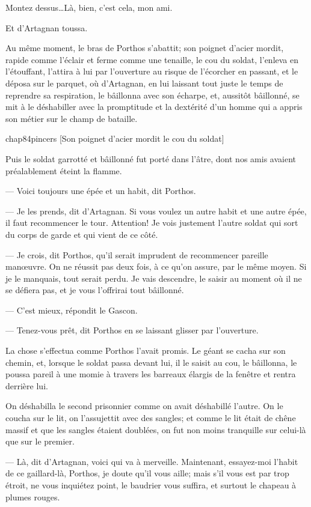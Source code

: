 Montez dessus\dots Là, bien, c'est cela, mon ami.

Et d'Artagnan toussa.

Au même moment, le bras de Porthos s'abattit; son poignet d'acier mordit, rapide comme l'éclair et ferme comme une tenaille, le cou du soldat, l'enleva en l'étouffant, l'attira à lui par l'ouverture au risque de l'écorcher en passant, et le déposa sur le parquet, où d'Artagnan, en lui laissant tout juste le temps de reprendre sa respiration, le bâillonna avec son écharpe, et, aussitôt bâillonné, se mit à le déshabiller avec la promptitude et la dextérité d'un homme qui a appris son métier sur le champ de bataille.

\begin{bwbigpic}
	[\basicscale] 
	{chap84pincers}
	[Son poignet d'acier mordit le cou du soldat]
\end{bwbigpic}

Puis le soldat garrotté et bâillonné fut porté dans l'âtre, dont nos amis avaient préalablement éteint la flamme.

— Voici toujours une épée et un habit, dit Porthos.

— Je les prends, dit d'Artagnan. Si vous voulez un autre habit et une autre épée, il faut recommencer le tour. Attention! Je vois justement l'autre soldat qui sort du corps de garde et qui vient de ce côté.

— Je crois, dit Porthos, qu'il serait imprudent de recommencer pareille manœuvre. On ne réussit pas deux fois, à ce qu'on assure, par le même moyen. Si je le manquais, tout serait perdu. Je vais descendre, le saisir au moment où il ne se défiera pas, et je vous l'offrirai tout bâillonné.

— C'est mieux, répondit le Gascon.

— Tenez-vous prêt, dit Porthos en se laissant glisser par l'ouverture.

La chose s'effectua comme Porthos l'avait promis. Le géant se cacha sur son chemin, et, lorsque le soldat passa devant lui, il le saisit au cou, le bâillonna, le poussa pareil à une momie à travers les barreaux élargis de la fenêtre et rentra derrière lui.

On déshabilla le second prisonnier comme on avait déshabillé l'autre. On le coucha sur le lit, on l'assujettit avec des sangles; et comme le lit était de chêne massif et que les sangles étaient doublées, on fut non moins tranquille sur celui-là que sur le premier.

— Là, dit d'Artagnan, voici qui va à merveille. Maintenant, essayez-moi l'habit de ce gaillard-là, Porthos, je doute qu'il vous aille; mais s'il vous est par trop étroit, ne vous inquiétez point, le baudrier vous suffira, et surtout le chapeau à plumes rouges.

